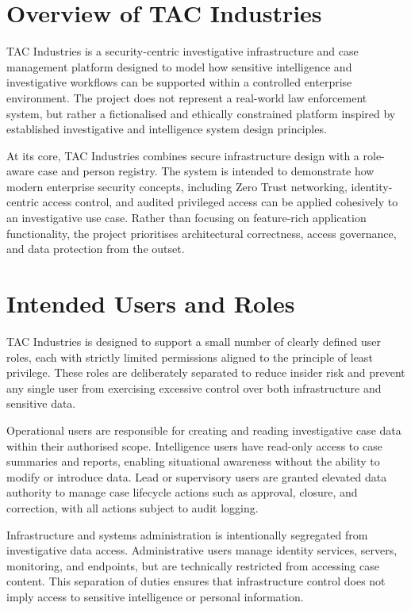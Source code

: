 \section{Overview of TAC Industries}

TAC Industries is a security-centric investigative infrastructure and case management platform designed to model how sensitive intelligence and investigative workflows can be supported within a controlled enterprise environment. The project does not represent a real-world law enforcement system, but rather a fictionalised and ethically constrained platform inspired by established investigative and intelligence system design principles.

At its core, TAC Industries combines secure infrastructure design with a role-aware case and person registry. The system is intended to demonstrate how modern enterprise security concepts, including Zero Trust networking, identity-centric access control, and audited privileged access can be applied cohesively to an investigative use case. Rather than focusing on feature-rich application functionality, the project prioritises architectural correctness, access governance, and data protection from the outset.


\section{Intended Users and Roles}

TAC Industries is designed to support a small number of clearly defined user roles, each with strictly limited permissions aligned to the principle of least privilege. These roles are deliberately separated to reduce insider risk and prevent any single user from exercising excessive control over both infrastructure and sensitive data.

Operational users are responsible for creating and reading investigative case data within their authorised scope. Intelligence users have read-only access to case summaries and reports, enabling situational awareness without the ability to modify or introduce data. Lead or supervisory users are granted elevated data authority to manage case lifecycle actions such as approval, closure, and correction, with all actions subject to audit logging.

Infrastructure and systems administration is intentionally segregated from investigative data access. Administrative users manage identity services, servers, monitoring, and endpoints, but are technically restricted from accessing case content. This separation of duties ensures that infrastructure control does not imply access to sensitive intelligence or personal information.

